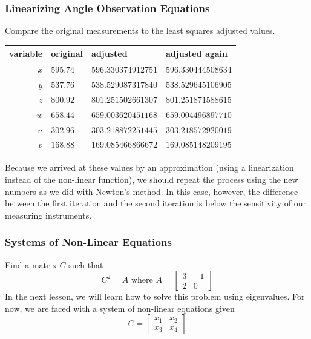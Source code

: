 \documentclass[xcolor=dvipsnames]{beamer}
\begin{document}
\begin{frame}
  \frametitle{Linearizing Angle Observation Equations}
Compare the original measurements to the least squares adjusted
values.

\bigskip

\begin{tabular}{r|l|l|l}
variable & original & adjusted & adjusted again \\ \hline
      $x$ & $595.74$  & $596.330374912751$ & $596.330444508634$ \\ 
      $y$ & $537.76$  & $538.529087317840$ & $538.529645106905$ \\ 
      $z$ & $800.92$  & $801.251502661307$ & $801.251871588615$ \\ 
      $w$ & $658.44$  & $659.003620451168$ & $659.004496897710$ \\ 
      $u$ & $302.96$  & $303.218872251445$ & $303.218572920019$ \\ 
      $v$ & $168.88$  & $169.085466866672$ & $169.085148209195$
\end{tabular}

\bigskip

Because we arrived at these values by an approximation (using a
linearization instead of the non-linear function), we should
repeat the process using the new numbers as we did with Newton's
method. In this case, however, the difference between the first
iteration and the second iteration is below the sensitivity of our
measuring instruments.
\end{frame}

\begin{frame}
  \frametitle{Systems of Non-Linear Equations}
   Find a matrix $C$ such that
  \begin{equation}
    \label{eq:eizuchan}
    C^{2}=A\mbox{ where }A=\left[
      \begin{array}{cc}
        3&-1 \\
        2&0
      \end{array}\right]
  \end{equation}
In the next lesson, we will learn how to solve this problem using
eigenvalues. For now, we are faced with a system of non-linear
equations given
\begin{equation}
  \label{eq:xohdaihu}
  C=\left[
    \begin{array}{cc}
      x_{1}&x_{2} \\
       x_{3}&x_{4}
    \end{array}\right]
\end{equation}
\end{frame}
\end{document}
